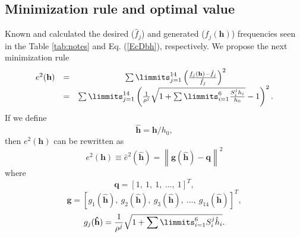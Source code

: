 \documentclass[11pt,twocolumn]{article}
\begin{document}
\subsection{Minimization rule and optimal value}
Known and calculated the desired ($\hat{f}_j$) and generated ($f_j(\mathbf{h})$) frequencies 
seen in the Table \ref{tab:notes}  and Eq. (\ref{EcDbh}), respectively.
We propose the next minimization rule
\begin{equation}
\label{eq:minimization}
\begin{matrix}
e^2(\mathbf{h}) & = & \sum\limmits_{j=1}^{14}\left(\frac{f_{j}(\mathbf{h})-\hat{f}_{j}}{\hat{f}_{j}}\right)^2\\
~ & = & \sum\limmits_{j=1}^{14}\left(\frac{1}{\rho^j}\sqrt{1+\sum\limmits_{i=1}^{6} \frac{S_{i}^{j} h_i}{h_0}}-1\right)^2.
\end{matrix}
\end{equation}
If we define
\begin{equation}\label{eq:varchange}
\mathbf{\hat{h}}=\mathbf{h}/h_0,
\end{equation}
then $e^2(\mathbf{h})$ can be rewritten as
\begin{equation}
e^2(\mathbf{h}) \equiv \hat{e}^2(\mathbf{\hat{h}}) = \left\|\mathbf{g}(\mathbf{\hat{h}})-\mathbf{q}\right\|^2
\end{equation}
where
\begin{equation}
\mathbf{q}=[1,~1,~1,~...,~1]^T,
\end{equation}
\begin{equation}
\mathbf{g}=[g_1(\mathbf{\hat{h}}),~g_2(\mathbf{\hat{h}}),~g_3(\mathbf{\hat{h}}),~...,~g_{14}(\mathbf{\hat{h}})]^T,
\end{equation}
\begin{equation}
g_j (\mathbf{\hat{h}})=\frac{1}{\rho^j}\sqrt{1+\sum\limmits_{i=1}^{6} S_{i}^{j} \hat{h}_i}.
\end{equation}
\end{document}
